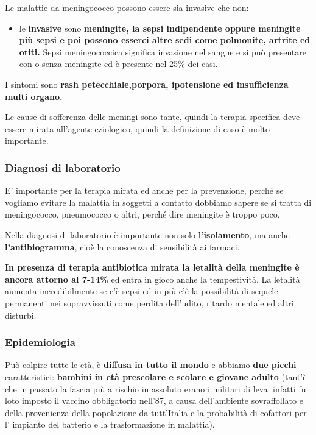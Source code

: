     Le malattie da meningococco possono essere sia invasive che non:
    \begin{itemize}
    
\item
  le \textbf{invasive} sono \textbf{meningite, la sepsi indipendente
  oppure meningite più sepsi e poi possono esserci altre sedi come
  polmonite, artrite ed otiti.} Sepsi meningococcica significa invasione
  nel sangue e si può presentare con o senza meningite ed è presente nel
  25\% dei casi.
  \end{itemize}

  I sintomi sono \textbf{rash petecchiale,porpora, ipotensione ed
  insufficienza multi organo.}

  Le cause di sofferenza delle meningi sono tante, quindi la terapia
  specifica deve essere mirata all'agente eziologico, quindi la
  definizione di caso è molto importante.

\subsubsection{Diagnosi di laboratorio}

  E' importante per la terapia mirata ed anche per la prevenzione,
  perché se vogliamo evitare la malattia in soggetti a contatto dobbiamo
  sapere se si tratta di meningococco, pneumococco o altri, perché dire
  meningite è troppo poco.

  Nella diagnosi di laboratorio è importante non solo
  \textbf{l'isolamento}, ma anche \textbf{l'antibiogramma}, cioè la
  conoscenza di sensibilità ai farmaci.

  \textbf{In presenza di terapia antibiotica mirata la letalità della
  meningite è ancora attorno al 7-14\%} ed entra in gioco anche la
  tempestività. La letalità aumenta incredibilmente se c'è sepsi ed in
  più c'è la possibilità di sequele permanenti nei sopravvissuti come
  perdita dell'udito, ritardo mentale ed altri disturbi.

\subsubsection{Epidemiologia}

  Può colpire tutte le età, è \textbf{diffusa in tutto il mondo} e
  abbiamo \textbf{due picchi} caratteristici: \textbf{bambini in età
  prescolare e scolare e giovane adulto} (tant'è che in passato la
  fascia più a rischio in assoluto erano i militari di leva: infatti fu
  loto imposto il vaccino obbligatorio nell'87, a causa dell'ambiente
  sovraffollato e della provenienza della popolazione da tutt'Italia e
  la probabilità di cofattori per l' impianto del batterio e la
  trasformazione in malattia).

